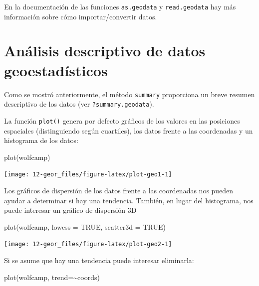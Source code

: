 \documentclass[
  spanish,
]{book}
\newenvironment{Shaded}{\begin{snugshade}}{\end{snugshade}}
\newcommand{\AttributeTok}[1]{\textcolor[rgb]{0.77,0.63,0.00}{#1}}
\newcommand{\ConstantTok}[1]{\textcolor[rgb]{0.00,0.00,0.00}{#1}}
\newcommand{\FunctionTok}[1]{\textcolor[rgb]{0.00,0.00,0.00}{#1}}
\newcommand{\NormalTok}[1]{#1}
\newcommand{\SpecialCharTok}[1]{\textcolor[rgb]{0.00,0.00,0.00}{#1}}
\theoremstyle{break}
\begin{document}
En la documentación de las funciones \texttt{as.geodata} y \texttt{read.geodata}
hay más información sobre cómo importar/convertir datos.

\hypertarget{anuxe1lisis-descriptivo-de-datos-geoestaduxedsticos}{%
\section{Análisis descriptivo de datos geoestadísticos}\label{anuxe1lisis-descriptivo-de-datos-geoestaduxedsticos}}

Como se mostró anteriormente, el método \texttt{summary} proporciona un breve resumen
descriptivo de los datos (ver \texttt{?summary.geodata}).

La función \texttt{plot()} genera por defecto gráficos de los
valores en las posiciones espaciales (distinguiendo según cuartiles),
los datos frente a las coordenadas y un histograma de los datos:

\begin{Shaded}
\begin{Highlighting}[]
\FunctionTok{plot}\NormalTok{(wolfcamp)}
\end{Highlighting}
\end{Shaded}

\begin{center}\texttt{[image: 12-geor\_files/figure-latex/plot-geo1-1]} \end{center}

Los gráficos de dispersión de los datos frente a las coordenadas nos pueden ayudar
a determinar si hay una tendencia. También, en lugar del histograma,
nos puede interesar un gráfico de dispersión 3D

\begin{Shaded}
\begin{Highlighting}[]
\FunctionTok{plot}\NormalTok{(wolfcamp, }\AttributeTok{lowess =} \ConstantTok{TRUE}\NormalTok{, }\AttributeTok{scatter3d =} \ConstantTok{TRUE}\NormalTok{) }
\end{Highlighting}
\end{Shaded}

\begin{center}\texttt{[image: 12-geor\_files/figure-latex/plot-geo2-1]} \end{center}

Si se asume que hay una tendencia puede interesar eliminarla:

\begin{Shaded}
\begin{Highlighting}[]
\FunctionTok{plot}\NormalTok{(wolfcamp, }\AttributeTok{trend=}\SpecialCharTok{\textasciitilde{}}\NormalTok{coords)}
\end{Highlighting}
\end{Shaded}
\end{document}

